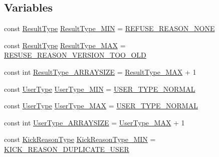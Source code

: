 \subsection*{Variables}
\begin{DoxyCompactItemize}
\item 
const \hyperlink{namespace_i_m_1_1_base_define_a1ff972f1012ff296dacbebee9e66e70f}{Result\+Type} \hyperlink{namespace_i_m_1_1_base_define_a1efb3754a9dad074becfbca57b50a830}{Result\+Type\+\_\+\+M\+I\+N} = \hyperlink{namespace_i_m_1_1_base_define_a1ff972f1012ff296dacbebee9e66e70fafc1f345a4d4c33b001fb2c2ff0027ee6}{R\+E\+F\+U\+S\+E\+\_\+\+R\+E\+A\+S\+O\+N\+\_\+\+N\+O\+N\+E}
\item 
const \hyperlink{namespace_i_m_1_1_base_define_a1ff972f1012ff296dacbebee9e66e70f}{Result\+Type} \hyperlink{namespace_i_m_1_1_base_define_abd5df6efb2e4248233c14b8b57a32984}{Result\+Type\+\_\+\+M\+A\+X} = \hyperlink{namespace_i_m_1_1_base_define_a1ff972f1012ff296dacbebee9e66e70fa2698b78bb98be5a1e2807f36c8acb3be}{R\+E\+S\+U\+S\+E\+\_\+\+R\+E\+A\+S\+O\+N\+\_\+\+V\+E\+R\+S\+I\+O\+N\+\_\+\+T\+O\+O\+\_\+\+O\+L\+D}
\item 
const int \hyperlink{namespace_i_m_1_1_base_define_acd76559acc440586d7db42f36f3cfa1d}{Result\+Type\+\_\+\+A\+R\+R\+A\+Y\+S\+I\+Z\+E} = \hyperlink{namespace_i_m_1_1_base_define_abd5df6efb2e4248233c14b8b57a32984}{Result\+Type\+\_\+\+M\+A\+X} + 1
\item 
const \hyperlink{namespace_i_m_1_1_base_define_a6e0b9bb7c94e3e0e512f9dc7ca69cb83}{User\+Type} \hyperlink{namespace_i_m_1_1_base_define_a3ef9c238572cf7d7efbc2930136f6916}{User\+Type\+\_\+\+M\+I\+N} = \hyperlink{namespace_i_m_1_1_base_define_a6e0b9bb7c94e3e0e512f9dc7ca69cb83a1b935e8acccdb9dc59e805cbddc711f3}{U\+S\+E\+R\+\_\+\+T\+Y\+P\+E\+\_\+\+N\+O\+R\+M\+A\+L}
\item 
const \hyperlink{namespace_i_m_1_1_base_define_a6e0b9bb7c94e3e0e512f9dc7ca69cb83}{User\+Type} \hyperlink{namespace_i_m_1_1_base_define_af34cc43f9c2459cd4586ee7560f5b3de}{User\+Type\+\_\+\+M\+A\+X} = \hyperlink{namespace_i_m_1_1_base_define_a6e0b9bb7c94e3e0e512f9dc7ca69cb83a1b935e8acccdb9dc59e805cbddc711f3}{U\+S\+E\+R\+\_\+\+T\+Y\+P\+E\+\_\+\+N\+O\+R\+M\+A\+L}
\item 
const int \hyperlink{namespace_i_m_1_1_base_define_a999490818b55f8c942a3182e9e2b6a49}{User\+Type\+\_\+\+A\+R\+R\+A\+Y\+S\+I\+Z\+E} = \hyperlink{namespace_i_m_1_1_base_define_af34cc43f9c2459cd4586ee7560f5b3de}{User\+Type\+\_\+\+M\+A\+X} + 1
\item 
const \hyperlink{namespace_i_m_1_1_base_define_a7ac3ce0aff5b2d7dec30a6876d9e6b75}{Kick\+Reason\+Type} \hyperlink{namespace_i_m_1_1_base_define_a98e8776dadcc253d7284eda4a0f999a4}{Kick\+Reason\+Type\+\_\+\+M\+I\+N} = \hyperlink{namespace_i_m_1_1_base_define_a7ac3ce0aff5b2d7dec30a6876d9e6b75a6182a8a201db91eb853c68757a602b8e}{K\+I\+C\+K\+\_\+\+R\+E\+A\+S\+O\+N\+\_\+\+D\+U\+P\+L\+I\+C\+A\+T\+E\+\_\+\+U\+S\+E\+R}

\end{DoxyCompactItemize}

